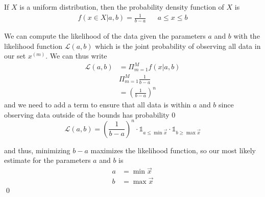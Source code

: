 If $X$ is a uniform distribution, then the probability density function of $X$ is
\begin{align*}
  f(x\in X|a,b)=\frac{1}{b-a} && a \leq x \leq b
\end{align*}

We can compute the likelihood of the data given the parameters $a$ and $b$ with the likelihood function $\mathcal{L}(a, b)$ which is the joint probability of observing all data in our set $x^{(m)}$. We can thus write
\begin{align*}
  \mathcal{L}(a,b) &= \Pi^{M}_{m=1}f(x|a,b)\\
                   & \Pi^{M}_{m=1} \frac{1}{b-a}\\
                   &= \left(\frac{1}{b-a}\right)^{n}
\end{align*}
and we need to add a term to ensure that all data is within $a$ and $b$ since observing data outside of the bounds has probability 0
\begin{equation*}
  \mathcal{L}(a,b) = \left(\frac{1}{b-a}\right)^{n}\cdot\mathbb{1}_{a\leq\min \vec{x}}\cdot\mathbb{1}_{b\geq\max \vec{x}}
\end{equation*}

and thus, minimizing $b-a$ maximizes the likelihood function, so our most likely estimate for the parameters $a$ and $b$ is
\begin{align*}
  a &= \min\vec{x}\\
  b &= \max\vec{x}
\end{align*}
\qed
